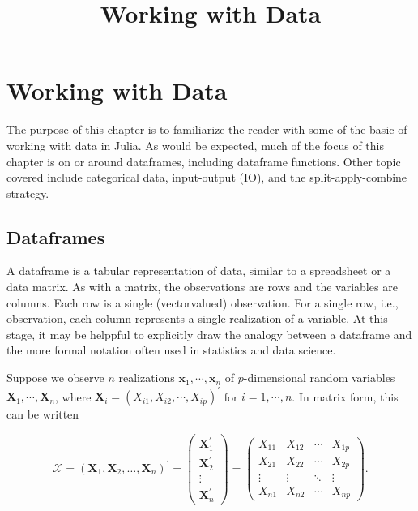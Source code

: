 \documentclass[11pt]{article}
\title{Working with Data}
\begin{document}
    
    
    \maketitle
    
    

    
    \section{Working with Data}\label{working-with-data}

The purpose of this chapter is to familiarize the reader with some of
the basic of working with data in Julia. As would be expected, much of
the focus of this chapter is on or around dataframes, including
dataframe functions. Other topic covered include categorical data,
input-output (IO), and the split-apply-combine strategy.

    \subsection{Dataframes}\label{dataframes}

A dataframe is a tabular representation of data, similar to a
spreadsheet or a data matrix. As with a matrix, the observations are
rows and the variables are columns. Each row is a single (vectorvalued)
observation. For a single row, i.e., observation, each column represents
a single realization of a variable. At this stage, it may be helppful to
explicitly draw the analogy between a dataframe and the more formal
notation often used in statistics and data science.

Suppose we observe \(n\) realizations
\(\mathbf{x}_1,\cdots,\mathbf{x}_n\) of \(p\)-dimensional random
variables \(\mathbf{X}_1,\cdots,\mathbf{X}_n\), where
\(\mathbf{X}_i=(X_{i1},X_{i2},\cdots,X_{ip})^{\prime}\) for
\(i=1,\cdots,n\). In matrix form, this can be written

\begin{equation}
\mathscr{X}=\left(\mathbf{X}_{1}, \mathbf{X}_{2}, \ldots, \mathbf{X}_{n}\right)^{\prime}=\left(\begin{array}{c}{\mathbf{X}_{1}^{\prime}} \\ {\mathbf{X}_{2}^{\prime}} \\ {\vdots} \\ {\mathbf{X}_{n}^{\prime}}\end{array}\right)=\left(\begin{array}{cccc}{X_{11}} & {X_{12}} & {\cdots} & {X_{1 p}} \\ {X_{21}} & {X_{22}} & {\cdots} & {X_{2 p}} \\ {\vdots} & {\vdots} & {\ddots} & {\vdots} \\ {X_{n 1}} & {X_{n 2}} & {\cdots} & {X_{n p}}\end{array}\right).
\end{equation}
\end{document}
